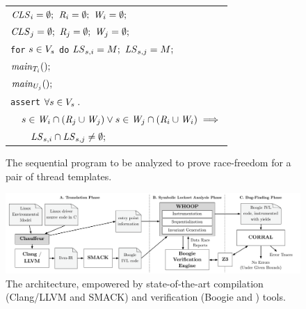 \begin{figure}
\footnotesize
\begin{tabular}{l}
$\mathit{CLS}_{i} = \emptyset;$ $\mathit{R}_{i} = \emptyset;$ $\mathit{W}_{i} = \emptyset;$ \\
$\mathit{CLS}_{j} = \emptyset;$ $\mathit{R}_{j} = \emptyset;$ $\mathit{W}_{j} = \emptyset;$ \\
\texttt{for} $s \in V_s$ \texttt{do} $\mathit{LS}_{s,i} = M;$ $\mathit{LS}_{s,j} = M;$ \smallskip
\\

$\mathit{main}_{T_{i}}();$ \\
$\mathit{main}_{U_{j}}();$ \smallskip\\

\texttt{assert} $\forall s \in V_s \; .$ \\

$\quad s \in \mathit{W}_{i} \cap (\mathit{R}_{j} \cup \mathit{W}_{j}) \vee s \in \mathit{W}_{j} \cap (\mathit{R}_{i} \cup \mathit{W}_{i}) \implies$ \\

$\quad\quad \mathit{LS}_{s,i} \cap \mathit{LS}_{s,j} \neq \emptyset;$ \\

\end{tabular}
\caption{The sequential program to be analyzed to prove race-freedom for a pair of thread templates.}
\label{fig:sequentialization}
\end{figure}

\begin{figure}
\centering
\includegraphics[width=.99\linewidth]{img/whoop.pdf}
\caption{The \whoop architecture, empowered by state-of-the-art compilation (Clang/LLVM and SMACK) and verification (Boogie and \corral) tools.}
\label{fig:whoop}
\end{figure}

